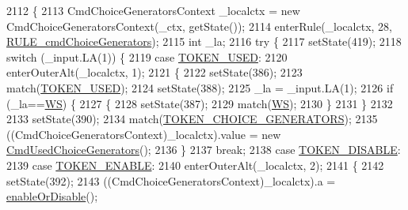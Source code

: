 \begin{DoxyCode}
2112                                                                                             \{
2113     CmdChoiceGeneratorsContext \_localctx = \textcolor{keyword}{new} CmdChoiceGeneratorsContext(\_ctx, getState());
2114     enterRule(\_localctx, 28, \hyperlink{classgov_1_1nasa_1_1jpf_1_1inspector_1_1client_1_1parser_1_1_console_grammar_parser_a49dd74d91ddf88f49df828ae49bf06e9}{RULE\_cmdChoiceGenerators});
2115     \textcolor{keywordtype}{int} \_la;
2116     \textcolor{keywordflow}{try} \{
2117       setState(419);
2118       \textcolor{keywordflow}{switch} (\_input.LA(1)) \{
2119       \textcolor{keywordflow}{case} \hyperlink{classgov_1_1nasa_1_1jpf_1_1inspector_1_1client_1_1parser_1_1_console_grammar_parser_af6dbf6c25f48d915dc7c5ea8e47a581f}{TOKEN\_USED}:
2120         enterOuterAlt(\_localctx, 1);
2121         \{
2122         setState(386);
2123         match(\hyperlink{classgov_1_1nasa_1_1jpf_1_1inspector_1_1client_1_1parser_1_1_console_grammar_parser_af6dbf6c25f48d915dc7c5ea8e47a581f}{TOKEN\_USED});
2124         setState(388);
2125         \_la = \_input.LA(1);
2126         \textcolor{keywordflow}{if} (\_la==\hyperlink{classgov_1_1nasa_1_1jpf_1_1inspector_1_1client_1_1parser_1_1_console_grammar_parser_a6914a3a3adbc350b12a7df9d1b24abf1}{WS}) \{
2127           \{
2128           setState(387);
2129           match(\hyperlink{classgov_1_1nasa_1_1jpf_1_1inspector_1_1client_1_1parser_1_1_console_grammar_parser_a6914a3a3adbc350b12a7df9d1b24abf1}{WS});
2130           \}
2131         \}
2132 
2133         setState(390);
2134         match(\hyperlink{classgov_1_1nasa_1_1jpf_1_1inspector_1_1client_1_1parser_1_1_console_grammar_parser_abc82b513c43997c7369162a20cb4887b}{TOKEN\_CHOICE\_GENERATORS});
2135          ((CmdChoiceGeneratorsContext)\_localctx).value =  \textcolor{keyword}{new} 
      \hyperlink{classgov_1_1nasa_1_1jpf_1_1inspector_1_1client_1_1commands_1_1_cmd_used_choice_generators}{CmdUsedChoiceGenerators}(); 
2136         \}
2137         \textcolor{keywordflow}{break};
2138       \textcolor{keywordflow}{case} \hyperlink{classgov_1_1nasa_1_1jpf_1_1inspector_1_1client_1_1parser_1_1_console_grammar_parser_a90e268d3330c4dd5955ee838092f75ff}{TOKEN\_DISABLE}:
2139       \textcolor{keywordflow}{case} \hyperlink{classgov_1_1nasa_1_1jpf_1_1inspector_1_1client_1_1parser_1_1_console_grammar_parser_a470e2b55da42238181711a5c607b3fd5}{TOKEN\_ENABLE}:
2140         enterOuterAlt(\_localctx, 2);
2141         \{
2142         setState(392);
2143         ((CmdChoiceGeneratorsContext)\_localctx).a = \hyperlink{classgov_1_1nasa_1_1jpf_1_1inspector_1_1client_1_1parser_1_1_console_grammar_parser_aa5fa0739c6c5c8346b0476e6f75df5e4}{enableOrDisable}();

\end{DoxyCode}
